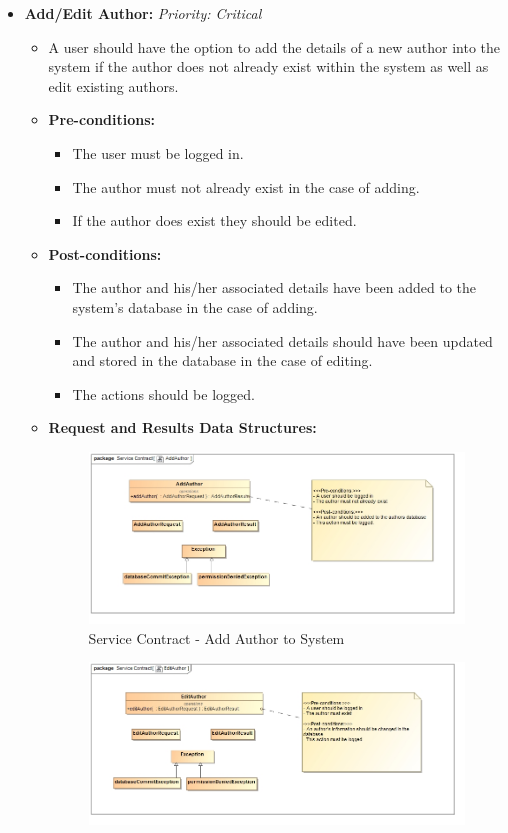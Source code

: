 \documentclass{article}
\begin{document}
\begin{itemize}
					\item \textbf{Add/Edit Author:} \hfill \textit{Priority: Critical}
					\begin{itemize}
						\item A user should have the option to add the details of a new author into the system if the author does not already exist within the system as well as edit existing authors.
						\item \textbf{Pre-conditions:}
						\begin{itemize}
							\item The user must be logged in.
							\item The author must not already exist in the case of adding.
							\item If the author does exist they should be edited.
						\end{itemize}
						\item \textbf{Post-conditions:}
						\begin{itemize}
							\item The author and his/her associated details have been added to the system's database in the case of adding.
							\item The author and his/her associated details should have been updated and stored in the database in the case of editing.
							\item The actions should be logged.
						\end{itemize}
						\item \textbf{Request and Results Data Structures:}
						\begin{figure}[H]
							\includegraphics[width=\linewidth]{../Diagrams/ServiceContracts/Publication subsystem/AddAuthor.jpg}
							\caption{Service Contract - Add Author to System}
						\end{figure}
						\begin{figure}[H]
							\includegraphics[width=\linewidth]{../Diagrams/ServiceContracts/Publication subsystem/EditAuthor.jpg}

\end{figure}
\end{itemize}
\end{itemize}
\end{document}
